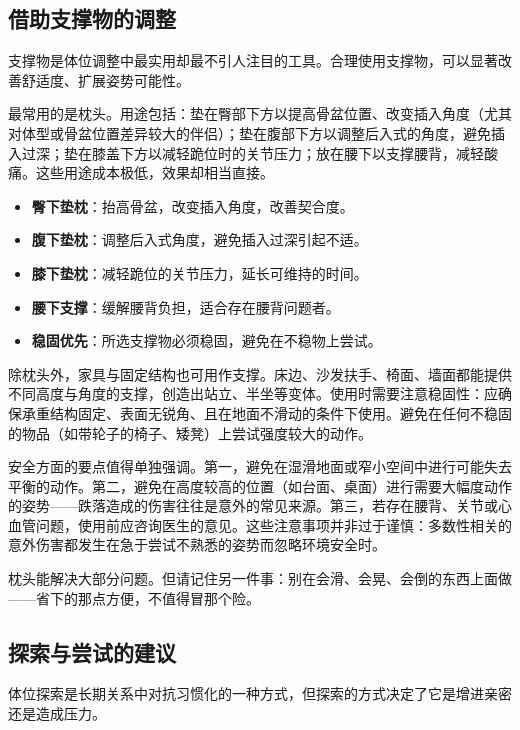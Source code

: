 \documentclass[12pt,UTF8]{ctexbook}
\newcommand{\keyword}[1]{\textbf{#1}}
\begin{document}
\subsection{借助支撑物的调整}

支撑物是体位调整中最实用却最不引人注目的工具。合理使用支撑物，可以显著改善舒适度、扩展姿势可能性。

最常用的是枕头。用途包括：垫在臀部下方以提高骨盆位置、改变插入角度（尤其对体型或骨盆位置差异较大的伴侣）；垫在腹部下方以调整后入式的角度，避免插入过深；垫在膝盖下方以减轻跪位时的关节压力；放在腰下以支撑腰背，减轻酸痛。这些用途成本极低，效果却相当直接。

\begin{itemize}
	\item \keyword{臀下垫枕}：抬高骨盆，改变插入角度，改善契合度。
	\item \keyword{腹下垫枕}：调整后入式角度，避免插入过深引起不适。
	\item \keyword{膝下垫枕}：减轻跪位的关节压力，延长可维持的时间。
	\item \keyword{腰下支撑}：缓解腰背负担，适合存在腰背问题者。
	\item \keyword{稳固优先}：所选支撑物必须稳固，避免在不稳物上尝试。
\end{itemize}

除枕头外，家具与固定结构也可用作支撑。床边、沙发扶手、椅面、墙面都能提供不同高度与角度的支撑，创造出站立、半坐等变体。使用时需要注意稳固性：应确保承重结构固定、表面无锐角、且在地面不滑动的条件下使用。避免在任何不稳固的物品（如带轮子的椅子、矮凳）上尝试强度较大的动作。

安全方面的要点值得单独强调。第一，避免在湿滑地面或窄小空间中进行可能失去平衡的动作。第二，避免在高度较高的位置（如台面、桌面）进行需要大幅度动作的姿势——跌落造成的伤害往往是意外的常见来源。第三，若存在腰背、关节或心血管问题，使用前应咨询医生的意见。这些注意事项并非过于谨慎：多数性相关的意外伤害都发生在急于尝试不熟悉的姿势而忽略环境安全时。

\begin{tcolorbox}[colback=pink!5!white,colframe=red!50!black,title=贴心小叮咛]
	枕头能解决大部分问题。但请记住另一件事：别在会滑、会晃、会倒的东西上面做——省下的那点方便，不值得冒那个险。
\end{tcolorbox}
\subsection{探索与尝试的建议}

体位探索是长期关系中对抗习惯化的一种方式，但探索的方式决定了它是增进亲密还是造成压力。
\end{document}
